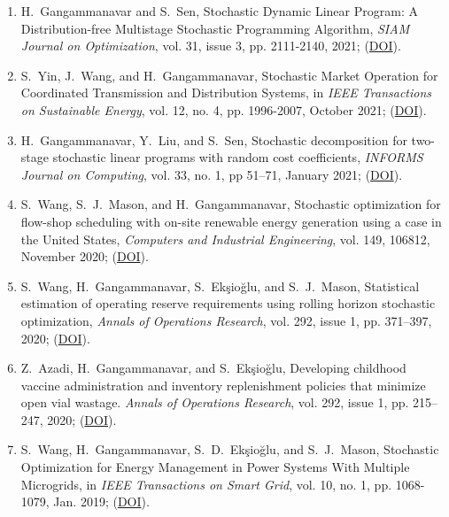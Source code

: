 \documentclass[hyperref, margin]{myResume}
\begin{document}
\begin{resume}
\begin{enumerate}[label=J\arabic*., leftmargin=*]
	\item H.\ Gangammanavar and S.\ Sen, Stochastic Dynamic Linear Program: A Distribution-free Multistage Stochastic Programming Algorithm, \textit{SIAM Journal on Optimization}, vol. 31, issue 3, pp. 2111-2140, 2021; (\href{https://doi.org/10.1137/19M1290735}{DOI}).

	\item S.\ Yin\footnotemark[3], J.\ Wang, and H.\ Gangammanavar, Stochastic Market Operation for Coordinated Transmission and Distribution Systems, in \textit{IEEE Transactions on Sustainable Energy}, vol. 12, no. 4, pp. 1996-2007, October 2021; (\href{https://doi.org/10.1109/TSTE.2021.3076037}{DOI}).

	\item H.\ Gangammanavar, Y.\ Liu, and S.\ Sen, Stochastic decomposition for two-stage stochastic linear programs with random cost coefficients, \textit{INFORMS Journal on Computing}, vol. 33, no. 1, pp 51–71, January 2021; (\href{https://doi.org/10.1287/ijoc.2019.0929}{DOI}).

	\item S.\ Wang\footnotemark[3], S.\ J.\ Mason, and H.\ Gangammanavar, Stochastic optimization for flow-shop scheduling with on-site renewable energy generation using a case in the United States, \textit{Computers and Industrial Engineering}, vol. 149, 106812, November 2020; (\href{https://doi.org/10.1016/j.cie.2020.106812}{DOI}).

	\item S.\ Wang\footnotemark[3], H.\ Gangammanavar, S.\ Ek{\c{s}}io{\u{g}}lu, and S.\ J.\ Mason, Statistical estimation of operating reserve requirements using rolling horizon stochastic optimization, \textit{Annals of Operations Research}, vol. 292, issue 1, pp. 371–397, 2020; (\href{https://doi.org/10.1007/s10479-019-03482-x}{DOI}).

	\item Z.\ Azadi\footnotemark[3], H.\ Gangammanavar, and S.\ Ek{\c{s}}io{\u{g}}lu, Developing childhood vaccine administration and inventory replenishment policies that minimize open vial wastage. \textit{Annals of Operations Research}, vol. 292, issue 1, pp. 215–247, 2020; (\href{https://doi.org/10.1007/s10479-019-03164-8}{DOI}).

	\item S.\ Wang\footnotemark[3], H.\ Gangammanavar, S.\ D.\ Ek{\c{s}}io{\u{g}}lu, and S.\ J.\ Mason, Stochastic Optimization for Energy Management in Power Systems With Multiple Microgrids, in {\it IEEE Transactions on Smart Grid}, vol. 10, no. 1, pp. 1068-1079, Jan. 2019; (\href{https://doi.org/10.1109/TSG.2017.2759159}{DOI}).


\end{enumerate}
\end{resume}
\end{document}
